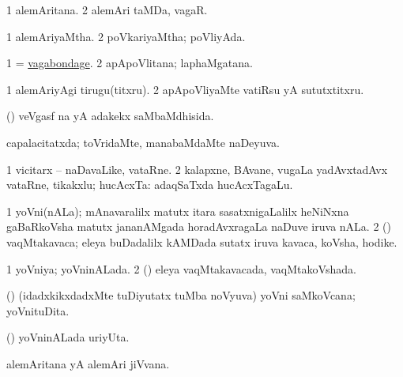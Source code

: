 \bentry
{} 
\gl{\nA}
\expl{}
\bmng
\bnum
\num{1} alemAritana. 
\num{2} alemAri taMDa, vagaR. 
\enum
\emng
\eentry

\bentry
{} 
\gl{\gu}
\expl{}
\bmng
\bnum
\num{1} alemAriyaMtha. 
\num{2} poVkariyaMtha; poVliyAda. 
\enum
\emng
\eentry

\bentry
{} 
\gl{\nA}
\expl{}
\bmng
\bnum
\num{1} = \hyperlink{vagabondage}{vagabondage}. 
\num{2} apApoVlitana; laphaMgatana. 
\enum
\emng
\eentry

\bentry
{} 
\gl{\akirx}
\expl{}
\bmng
\bnum
\num{1} alemAriyAgi tirugu(titxru). 
\num{2} apApoVliyaMte vatiRsu yA sututxtitxru. 
\enum
\emng
\eentry

\bentry
{} 
\gl{\gu}
\expl{}
\bmng
 (\aMrashA) veVgasf  na yA adakekx saMbaMdhisida. 
\emng
\eentry

\bentry
{} 
\gl{\gu}
\expl{}
\bmng
 capalacitatxda; toVridaMte, manabaMdaMte naDeyuva. 
\emng
\eentry

\bentry
{} 
\gl{\nA}
\bmng
\bnum
\num{1} vicitarx -- naDavaLike, vataRne. 
\num{2} kalapxne, BAvane, \mo vugaLa yadAvxtadAvx vataRne, tikakxlu; hucAcxTa:  adaqSaTxda hucAcxTagaLu. 
\enum
\emng
\eentry

\bentry
{} 
\gl{\nA}
\bmng
\bnum
\num{1} yoVni(nALa); mAnavaralilx matutx itara sasatxnigaLalilx heNiNxna gaBaRkoVsha matutx jananAMgada horadAvxragaLa naDuve iruva nALa. 
\num{2} (\savi) vaqMtakavaca; eleya buDadalilx kAMDada sutatx iruva kavaca, koVsha, hodike. 
\enum
\emng
\eentry

\bentry
{} 
\gl{\gu}
\expl{}
\bmng
\bnum
\num{1} yoVniya; yoVninALada. 
\num{2} (\savi) eleya vaqMtakavacada, vaqMtakoVshada. 
\enum
\emng
\eentry

\bentry
{} 
\gl{\nA}
\expl{}
\bmng
 (\veYshA) (idadxkikxdadxMte tuDiyutatx tuMba noVyuva) yoVni saMkoVcana; yoVnituDita. 
\emng
\eentry

\bentry
{} 
\gl{\nA}
\expl{}
\bmng
 (\veYshA) yoVninALada uriyUta. 
\emng
\eentry

\bentry
{} 
\gl{\nA}
\expl{}
\bmng
 alemAritana yA alemAri jiVvana. 
\emng
\eentry

